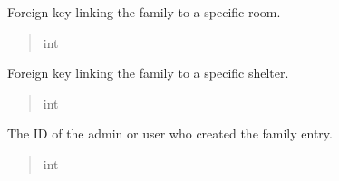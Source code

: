 \documentclass[letterpaper,10pt,english]{sphinxmanual}
\begin{document}
\begin{fulllineitems}
\begin{fulllineitems}
\label{\detokenize{app.mysql:app.mysql.family.Family.idRoom}}
\pysigstartsignatures
\pysigline
{}
\pysigstopsignatures
\sphinxAtStartPar
Foreign key linking the family to a specific room.
\begin{quote}\begin{description}
\sphinxAtStartPar
int

\end{description}\end{quote}

\end{fulllineitems}


\begin{fulllineitems}
\label{\detokenize{app.mysql:app.mysql.family.Family.idShelter}}
\pysigstartsignatures
\pysigline
{}
\pysigstopsignatures
\sphinxAtStartPar
Foreign key linking the family to a specific shelter.
\begin{quote}\begin{description}
\sphinxAtStartPar
int

\end{description}\end{quote}

\end{fulllineitems}


\begin{fulllineitems}
\label{\detokenize{app.mysql:app.mysql.family.Family.createdBy}}
\pysigstartsignatures
\pysigline
{}
\pysigstopsignatures
\sphinxAtStartPar
The ID of the admin or user who created the family entry.
\begin{quote}\begin{description}
\sphinxAtStartPar
int

\end{description}\end{quote}

\end{fulllineitems}



\end{fulllineitems}
\end{document}
